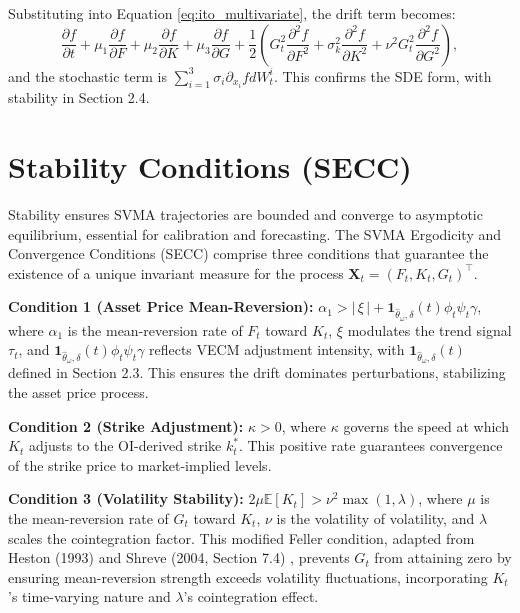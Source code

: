 \documentclass[12pt]{report}
\begin{document}
\vspace{0.2in}

Substituting into Equation \ref{eq:ito_multivariate}, the drift term becomes:
\[
    \frac{\partial f}{\partial t} + \mu_1 \frac{\partial f}{\partial F} + \mu_2 \frac{\partial f}{\partial K} + \mu_3 \frac{\partial f}{\partial G} + \frac{1}{2} \left( G_t^2 \frac{\partial^2 f}{\partial F^2} + \sigma_k^2 \frac{\partial^2 f}{\partial K^2} + \nu^2 G_t^2 \frac{\partial^2 f}{\partial G^2} \right),
\]
and the stochastic term is \(\sum_{i=1}^3 \sigma_i \partial_{x_i} f dW_t^i\). This confirms the SDE form, with stability in Section 2.4.

\section{Stability Conditions (SECC)}

Stability ensures SVMA trajectories are bounded and converge to asymptotic equilibrium, essential for calibration and forecasting. The SVMA Ergodicity and Convergence Conditions (SECC) comprise three conditions that guarantee the existence of a unique invariant measure for the process \(\mathbf{X}_t = (F_t, K_t, G_t)^\top\).

\vspace{0.2in}

\textbf{Condition 1 (Asset Price Mean-Reversion):} \(\alpha_1 > |\,\xi\,| + \mathbf{1}_{\hat{\theta}_\omega, \delta}(t) \phi_t \psi_t \gamma\), where \(\alpha_1\) is the mean-reversion rate of \(F_t\) toward \(K_t\), \(\xi\) modulates the trend signal \(\tau_t\), and \(\mathbf{1}_{\hat{\theta}_\omega, \delta}(t) \phi_t \psi_t \gamma\) reflects VECM adjustment intensity, with \(\mathbf{1}_{\hat{\theta}_\omega, \delta}(t)\) defined in Section 2.3. This ensures the drift dominates perturbations, stabilizing the asset price process.

\vspace{0.2in}

\textbf{Condition 2 (Strike Adjustment):} \(\kappa > 0\), where \(\kappa\) governs the speed at which \(K_t\) adjusts to the OI-derived strike \(k_t^*\). This positive rate guarantees convergence of the strike price to market-implied levels.

\vspace{0.2in}

\textbf{Condition 3 (Volatility Stability):} \(2\mu \mathbb{E}[K_t] > \nu^2 \max(1, \lambda)\), where \(\mu\) is the mean-reversion rate of \(G_t\) toward \(K_t\), \(\nu\) is the volatility of volatility, and \(\lambda\) scales the cointegration factor. This modified Feller condition, adapted from Heston (1993) \cite{heston1993closed} and Shreve (2004, Section 7.4) \cite{shreve2004}, prevents \(G_t\) from attaining zero by ensuring mean-reversion strength exceeds volatility fluctuations, incorporating \(K_t\)'s time-varying nature and \(\lambda\)'s cointegration effect.
\end{document}

